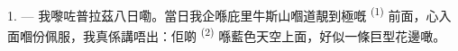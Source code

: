 %
%
%
%
%
%
%
%
%
%
%

\VUsaut{4.0mm}
\VUsaut{3.0mm}

\VUsaut{3.0mm}

\VUsaut{3.0mm}

1. --- 我嚟咗普拉茲八日嘞。當日我企喺庇里牛斯山嗰道靚到極嘅
\textsuperscript{(1)} 前面，心入面嗰份佩服，我真係講唔出：佢啲
\textsuperscript{(2)} 喺藍色天空上面，好似一條巨型花邊噉。

